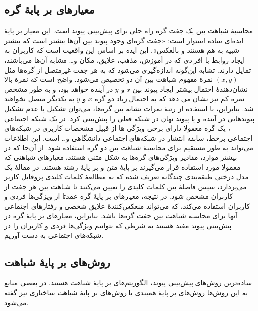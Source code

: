\subsection{معیارهای بر پایهٔ گره}
محاسبهٔ شباهت بین یک جفت گره راه حلی \intuitive برای پیش‌بینی پیوند است. این معیار بر پایهٔ ایده‌ای ساده‌ استوار است: «جفت گره‌ای \Likelihood وجود پیوند بین آن‌ها بیشتر است که بیشتر شبیه به هم هستند و بالعکس»\cite{wang2015link}. این ایده بر اساس این واقعیت است که کاربران به ایجاد روابط با افرادی که در آموزش، مذهب، علایق، مکان و… مشابه آن‌ها می‌باشند، تمایل دارند. تشابه این‌گونه اندازه‌گیری می‌شود که به هر جفت غیرمتصل از گره‌ها مثل $(x,y)$ نمرهٔ مفهوم شباهت بین آن دو تخصیص می‌شود. واضح است که نمرهٔ بالا نشان‌دهندهٔ احتمال بیشتر ایجاد پیوند بین $x$ و $y$ در آینده خواهد بود، و به طور مشخص  نمره کم نیز نشان می دهد که به احتمال زیاد دو گره $x$ و $y$ به یکدیگر متصل نخواهند شد. بنابراین، با استفاده از رتبهٔ نمرات تشابه بین گره‌ها، می‌توان تشکیل یا عدم تشکیل پیوندهایی در آینده و یا پیوند نهان در شبکه فعلی را پیش‌بینی کرد.
در یک شبکه اجتماعی \practical، یک گره معمولا دارای برخی ویژگی ها از قبیل مشخصات کاربری در شبکه‌های اجتماعی برخط، سابقه انتشار در شبکه‌های اجتماعی دانشگاهی و… است. این اطلاعات می‌تواند به طور مستقیم برای محاسبهٔ شباهت بین دو گره استفاده شود. از آن‌جا که در بیشتر موارد، مقادیر ویژگی‌های گره‌ها به شکل متنی هستند، معیارهای شباهتی که معمولا مورد استفاده قرار می‌گیرند بر پایهٔ متن و بر پایهٔ رشته هستند.
در مقالهٔ \cite{bhattacharyya2011analysis} یک مدل درختی طبقه‌بندی چندگانه تعریف شده که به مطالعهٔ کلمات کلیدی پروفایل کاربر می‌پردازد، سپس فاصلهٔ بین کلمات کلیدی را تعیین می‌کنند تا شباهت بین هر جفت از کاربران مشخص شود.
در نتیجه، معیارهای بر پایهٔ گره عمدتا از ویژگی‌ها فردی و \actions کاربران استفاده می‌کند، که می‌تواند منعکس‌کنندهٔ علایق شخصی و رفتارهای اجتماعی آنها برای محاسبه شباهت بین جفت گره‌ها باشد. بنابراین، معیارهای بر پایهٔ گره در پیش‌بینی پیوند مفید هستند به شرطی که بتوانیم ویژگی‌ها فردی و \actions کاربران را در شبکه‌های اجتماعی به دست آوریم\cite{anderson2012effects}.

\subsection{روش‌های بر پایهٔ شباهت}\label{subsec:similarity}
ساده‌ترین \Framework روش‌های پیش‌بینی پیوند، الگوریتم‌های بر پایه‌ٔ شباهت هستند. در بعضی منابع به این روش‌ها روش‌های بر پایهٔ همبندی یا روش‌های بر پایهٔ شباهت ساختاری نیز گفته می‌شود.

